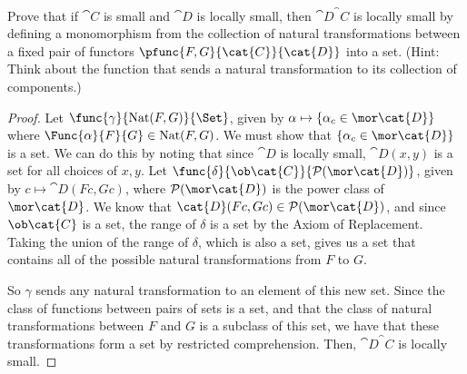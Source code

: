 \documentclass[../../main]{subfiles}
\begin{document}
\paragraph{}
\begin{exercise}
	Prove that if $\cat{C}$ is small and $\cat{D}$ is locally small, then
	$\cat{D}^\cat{C}$ is locally small by defining a monomorphism from the
	collection of natural transformations between a fixed pair of functors
	$\pfunc{F,G}{\cat{C}}{\cat{D}}$ into a set. (Hint: Think about the function
	that sends a natural transformation to its collection of components.)
\end{exercise}

\begin{proof}
	Let $\func{\gamma}{\text{Nat}(F,G)}{\Set}$, given by
	$\alpha\mapsto\{\alpha_c\in\mor\cat{D}\}$ where
	$\Func{\alpha}{F}{G}\in\text{Nat}(F,G)$. We must show that
	$\{\alpha_c\in\mor\cat{D}\}$ is a set. We can do this by noting that since
	$\cat{D}$ is locally small, $\cat{D}(x,y)$ is a set for all choices of
	$x,y$. Let $\func{\delta}{\ob\cat{C}}{\mathcal{P}(\mor\cat{D})}$, given by
	$c\mapsto\cat{D}(Fc,Gc)$, where $\mathcal{P}(\mor\cat{D})$ is the power
	class of $\mor\cat{D}$. We know that
	$\cat{D}(Fc,Gc)\in\mathcal{P}(\mor\cat{D})$, and since $\ob\cat{C}$ is a
	set, the range of $\delta$ is a set by the Axiom of Replacement. Taking the
	union of the range of $\delta$, which is also a set, gives us a set that
	contains all of the possible natural transformations from $F$ to $G$.

	So $\gamma$ sends any natural transformation to an element of this new set.
	Since the class of functions between pairs of sets is a set, and that the
	class of natural transformations between $F$ and $G$ is a subclass of this
	set, we have that these transformations form a set by restricted
	comprehension. Then, $\cat{D}^\cat{C}$ is locally small.
\end{proof}
\end{document}
